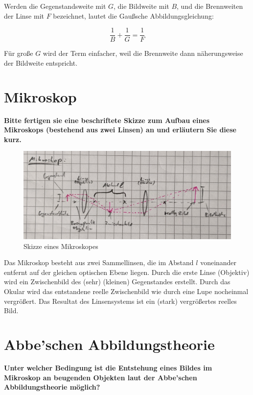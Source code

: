 \documentclass[a4paper, 12pt]{article}
\begin{document}
Werden die Gegenstandsweite mit $G$, die Bildweite mit $B$, und die Brennweiten der Linse mit $F$ bezeichnet, lautet die Gaußsche Abbildungsgleichung:

$$\frac{1}{B}+\frac{1}{G} = \frac{1}{F}$$

Für große $G$ wird der Term einfacher, weil die Brennweite dann näherungsweise der Bildweite entspricht.

\newpage
\section{Mikroskop}
\textbf{Bitte fertigen sie eine beschriftete Skizze zum Aufbau eines Mikroskops (bestehend aus zwei Linsen) an und erläutern Sie diese kurz.}

\begin{figure}[h]
\centering
	\includegraphics[width=\textwidth]{mikroskop.png}
	\caption{Skizze eines Mikroskopes}
\end{figure}

Das Mikroskop besteht aus zwei Sammellinsen, die im Abstand $l$ voneinander entfernt auf der gleichen optischen Ebene liegen. 
Durch die erste Linse (Objektiv) wird ein Zwischenbild des (sehr) (kleinen) Gegenstandes erstellt.
Durch das Okular wird das entstandene reelle Zwischenbild wie durch eine Lupe nocheinmal vergrößert. 
Das Resultat des Linsensystems ist ein (stark) vergrößertes reelles Bild.
 
\section{Abbe’schen Abbildungstheorie}
\textbf{Unter welcher Bedingung ist die Entstehung eines Bildes im Mikroskop an beugenden Objekten laut der Abbe’schen Abbildungstheorie möglich?}
\end{document}
